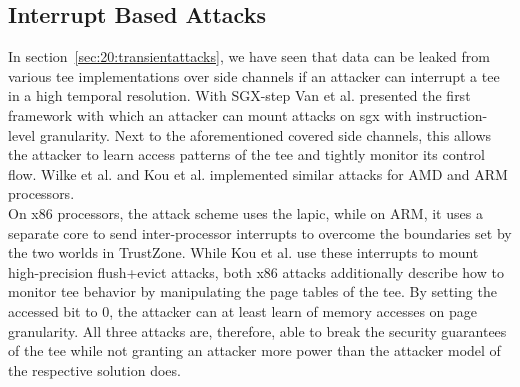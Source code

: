 \subsection{Interrupt Based Attacks}
\label{sec:20:interrupt_sca}
In section~\ref{sec:20:transientattacks}, we have seen that data can be leaked
from various \gls{tee} implementations over side channels if an attacker can
interrupt a \gls{tee} in a high temporal resolution. With SGX-step Van et al.
presented the first framework with which an attacker can mount attacks on
\gls{sgx} with instruction-level granularity.\cite{van2017sgx} Next to the
aforementioned covered side channels, this allows the attacker to learn access
patterns of the \gls{tee} and tightly monitor its control flow. Wilke et al. and
Kou et al. implemented similar attacks for AMD and ARM
processors.\cite{wilke2023sev, kou2021load}\\

On x86 processors, the attack scheme uses the \gls{lapic}, while on ARM, it uses
a separate core to send inter-processor interrupts to overcome the boundaries
set by the two worlds in TrustZone. While Kou et al. use these interrupts to
mount high-precision flush+evict attacks, both x86 attacks additionally describe
how to monitor \gls{tee} behavior by manipulating the page tables of the
\gls{tee}. By setting the accessed bit to 0, the attacker can at least learn of
memory accesses on page granularity. All three attacks are, therefore, able to
break the security guarantees of the \gls{tee} while not granting an attacker
more power than the attacker model of the respective solution does.
